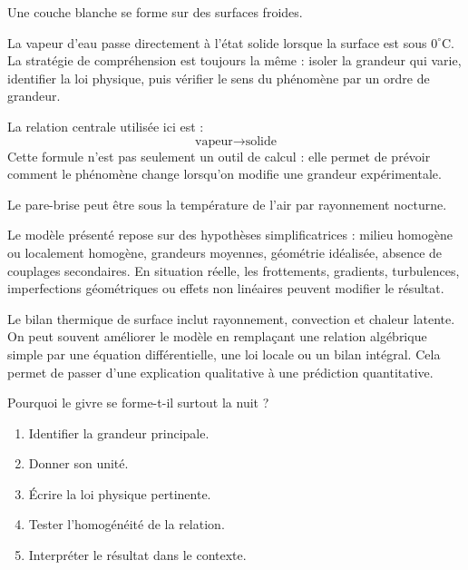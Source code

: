 \documentclass[11pt,a4paper]{article}
\begin{document}
\begin{exemplebox}
Une couche blanche se forme sur des surfaces froides.
\end{exemplebox}

\begin{methodebox}
La vapeur d'eau passe directement à l'état solide lorsque la surface est sous $0^\circ$C.
La stratégie de compréhension est toujours la même : isoler la grandeur qui varie, identifier la loi physique, puis vérifier le sens du phénomène par un ordre de grandeur.
\end{methodebox}

\begin{theorembox}
La relation centrale utilisée ici est :
\[
\text{vapeur}\rightarrow\text{solide}
\]
Cette formule n'est pas seulement un outil de calcul : elle permet de prévoir comment le phénomène change lorsqu'on modifie une grandeur expérimentale.
\end{theorembox}

\begin{odgbox}
Le pare-brise peut être sous la température de l'air par rayonnement nocturne.
\end{odgbox}

\begin{attentionbox}
Le modèle présenté repose sur des hypothèses simplificatrices : milieu homogène ou localement homogène, grandeurs moyennes, géométrie idéalisée, absence de couplages secondaires. En situation réelle, les frottements, gradients, turbulences, imperfections géométriques ou effets non linéaires peuvent modifier le résultat.
\end{attentionbox}

\begin{approfondissementbox}
Le bilan thermique de surface inclut rayonnement, convection et chaleur latente.
On peut souvent améliorer le modèle en remplaçant une relation algébrique simple par une équation différentielle, une loi locale ou un bilan intégral. Cela permet de passer d'une explication qualitative à une prédiction quantitative.
\end{approfondissementbox}

\begin{exercicebox}
Pourquoi le givre se forme-t-il surtout la nuit ?
\begin{enumerate}
  \item Identifier la grandeur principale.
  \item Donner son unité.
  \item Écrire la loi physique pertinente.
  \item Tester l'homogénéité de la relation.
  \item Interpréter le résultat dans le contexte.
\end{enumerate}
\end{exercicebox}
\end{document}
